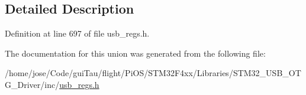 \subsection{Detailed Description}


Definition at line 697 of file usb\-\_\-regs.\-h.



The documentation for this union was generated from the following file\-:\begin{DoxyCompactItemize}
\item 
/home/jose/\-Code/gui\-Tau/flight/\-Pi\-O\-S/\-S\-T\-M32\-F4xx/\-Libraries/\-S\-T\-M32\-\_\-\-U\-S\-B\-\_\-\-O\-T\-G\-\_\-\-Driver/inc/\hyperlink{_s_t_m32_f4xx_2_libraries_2_s_t_m32___u_s_b___o_t_g___driver_2inc_2usb__regs_8h}{usb\-\_\-regs.\-h}\end{DoxyCompactItemize}
